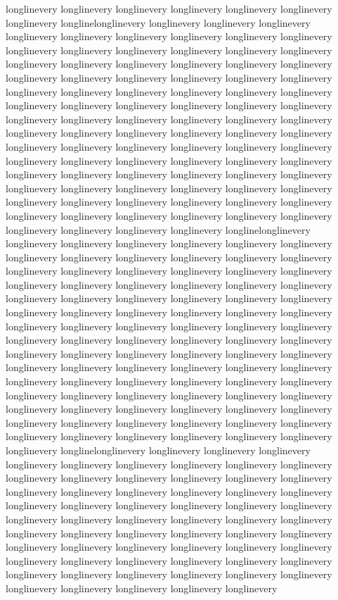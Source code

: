 {longlinevery longlinevery longlinevery longlinevery longlinevery longlinevery longlinevery longlinelonglinevery longlinevery longlinevery longlinevery longlinevery longlinevery longlinevery longlinevery longlinevery longlinevery longlinevery longlinevery longlinevery longlinevery longlinevery longlinevery longlinevery longlinevery longlinevery longlinevery longlinevery longlinevery longlinevery longlinevery longlinevery longlinevery longlinevery longlinevery longlinevery longlinevery longlinevery longlinevery longlinevery longlinevery longlinevery longlinevery longlinevery longlinevery longlinevery longlinevery longlinevery longlinevery longlinevery longlinevery longlinevery longlinevery longlinevery longlinevery longlinevery longlinevery longlinevery longlinevery longlinevery longlinevery longlinevery longlinevery longlinevery longlinevery longlinevery longlinevery longlinevery longlinevery longlinevery longlinevery longlinevery longlinevery longlinevery longlinevery longlinevery longlinevery longlinevery longlinevery longlinevery longlinevery longlinevery longlinevery longlinevery longlinevery longlinevery longlinevery longlinevery longlinevery longlinevery longlinevery longlinevery longlinevery longlinevery longlinevery longlinevery longlinevery longlinevery longlinevery longlinelonglinevery longlinevery longlinevery longlinevery longlinevery longlinevery longlinevery longlinevery longlinevery longlinevery longlinevery longlinevery longlinevery longlinevery longlinevery longlinevery longlinevery longlinevery longlinevery longlinevery longlinevery longlinevery longlinevery longlinevery longlinevery longlinevery longlinevery longlinevery longlinevery longlinevery longlinevery longlinevery longlinevery longlinevery longlinevery longlinevery longlinevery longlinevery longlinevery longlinevery longlinevery longlinevery longlinevery longlinevery longlinevery longlinevery longlinevery longlinevery longlinevery longlinevery longlinevery longlinevery longlinevery longlinevery longlinevery longlinevery longlinevery longlinevery longlinevery longlinevery longlinevery longlinevery longlinevery longlinevery longlinevery longlinevery longlinevery longlinevery longlinevery longlinevery longlinevery longlinevery longlinevery longlinevery longlinevery longlinevery longlinevery longlinevery longlinevery longlinevery longlinevery longlinevery longlinevery longlinevery longlinevery longlinevery longlinevery longlinevery longlinevery longlinevery longlinevery longlinevery longlinelonglinevery longlinevery longlinevery longlinevery longlinevery longlinevery longlinevery longlinevery longlinevery longlinevery longlinevery longlinevery longlinevery longlinevery longlinevery longlinevery longlinevery longlinevery longlinevery longlinevery longlinevery longlinevery longlinevery longlinevery longlinevery longlinevery longlinevery longlinevery longlinevery longlinevery longlinevery longlinevery longlinevery longlinevery longlinevery longlinevery longlinevery longlinevery longlinevery longlinevery longlinevery longlinevery longlinevery longlinevery longlinevery longlinevery longlinevery longlinevery longlinevery longlinevery longlinevery longlinevery longlinevery longlinevery longlinevery longlinevery longlinevery longlinevery longlinevery longlinevery longlinevery longlinevery longlinevery }

